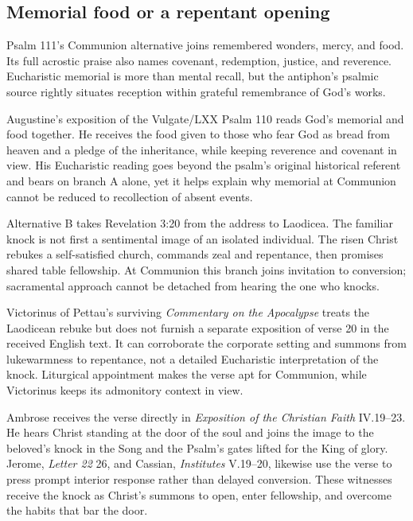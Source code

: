 \subsection*{Memorial food or a repentant opening\enspace{}}

Psalm 111's Communion alternative joins remembered wonders, mercy, and food. Its full acrostic praise also names covenant, redemption, justice, and reverence. Eucharistic memorial is more than mental recall, but the antiphon's psalmic source rightly situates reception within grateful remembrance of God's works.

Augustine's exposition of the Vulgate/LXX Psalm 110 reads God's memorial and food together. He receives the food given to those who fear God as bread from heaven and a pledge of the inheritance, while keeping reverence and covenant in view. His Eucharistic reading goes beyond the psalm's original historical referent and bears on branch A alone, yet it helps explain why memorial at Communion cannot be reduced to recollection of absent events.

Alternative B takes Revelation 3:20 from the address to Laodicea. The familiar knock is not first a sentimental image of an isolated individual. The risen Christ rebukes a self-satisfied church, commands zeal and repentance, then promises shared table fellowship. At Communion this branch joins invitation to conversion; sacramental approach cannot be detached from hearing the one who knocks.

Victorinus of Pettau's surviving \emph{Commentary on the Apocalypse} treats the Laodicean rebuke but does not furnish a separate exposition of verse 20 in the received English text. It can corroborate the corporate setting and summons from lukewarmness to repentance, not a detailed Eucharistic interpretation of the knock. Liturgical appointment makes the verse apt for Communion, while Victorinus keeps its admonitory context in view.

Ambrose receives the verse directly in \emph{Exposition of the Christian Faith} IV.19--23. He hears Christ standing at the door of the soul and joins the image to the beloved's knock in the Song and the Psalm's gates lifted for the King of glory. Jerome, \emph{Letter 22} 26, and Cassian, \emph{Institutes} V.19--20, likewise use the verse to press prompt interior response rather than delayed conversion. These witnesses receive the knock as Christ's summons to open, enter fellowship, and overcome the habits that bar the door.


